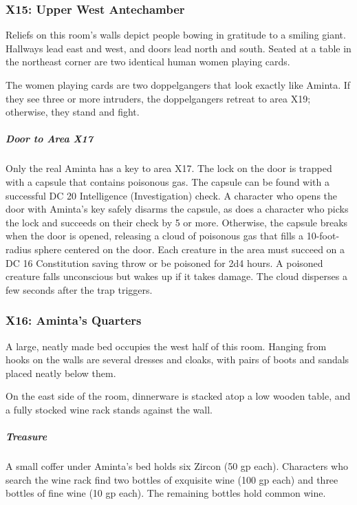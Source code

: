 \documentclass[10pt,a4paper,twoside,bg=print,twocolumn,openany,nodeprecatedcode]{dndbook}
\begin{document}
\subsubsection{X15: Upper West Antechamber}
\begin{DndReadAloud}{}
Reliefs on this room's walls depict people bowing in gratitude to a smiling giant. Hallways lead east and west, and doors lead north and south. Seated at a table in the northeast corner are two identical human women playing cards.

\end{DndReadAloud}

The women playing cards are two doppelgangers that look exactly like Aminta. If they see three or more intruders, the doppelgangers retreat to area X19; otherwise, they stand and fight.

\subparagraph{Door to Area X17}
Only the real Aminta has a key to area X17. The lock on the door is trapped with a capsule that contains poisonous gas. The capsule can be found with a successful DC 20 Intelligence (Investigation) check. A character who opens the door with Aminta's key safely disarms the capsule, as does a character who picks the lock and succeeds on their check by 5 or more. Otherwise, the capsule breaks when the door is opened, releasing a cloud of poisonous gas that fills a 10-foot-radius sphere centered on the door. Each creature in the area must succeed on a DC 16 Constitution saving throw or be poisoned for 2d4 hours. A poisoned creature falls unconscious but wakes up if it takes damage. The cloud disperses a few seconds after the trap triggers.

\subsubsection{X16: Aminta's Quarters}
\begin{DndReadAloud}{}
A large, neatly made bed occupies the west half of this room. Hanging from hooks on the walls are several dresses and cloaks, with pairs of boots and sandals placed neatly below them.

On the east side of the room, dinnerware is stacked atop a low wooden table, and a fully stocked wine rack stands against the wall.

\end{DndReadAloud}

\subparagraph{Treasure}
A small coffer under Aminta's bed holds six Zircon (50 gp each). Characters who search the wine rack find two bottles of exquisite wine (100 gp each) and three bottles of fine wine (10 gp each). The remaining bottles hold common wine.
\end{document}
